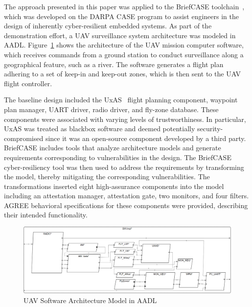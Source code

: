 

The approach presented in this paper was applied to the BriefCASE toolchain~\cite{CASEAtScale}, which was developed on the DARPA CASE program to assist engineers in the design of inherently cyber-resilient embedded systems.
As part of the demonstration effort, a UAV surveillance system architecture was modeled in AADL. 
%
Figure~\ref{SW} shows the architecture of the UAV mission computer software, which receives commands from a ground station to conduct surveillance along a geographical feature, such as a river.  The software generates a flight plan adhering to a set of keep-in and keep-out zones, which is then sent to the UAV flight controller. 

The baseline design included the UxAS~\cite{uxas} flight planning component, waypoint plan manager, UART driver, radio driver, and fly-zone database.
These components were associated with varying levels of trustworthiness.
In particular, UxAS was treated as blackbox software and deemed potentially security-compromised since it was an open-source component developed by a third party.
BriefCASE includes tools that analyze architecture models and generate requirements corresponding to vulnerabilities in the design.  The BriefCASE cyber-resiliency tool was then used to address the requirements by transforming the model, thereby mitigating the corresponding vulnerabilities.  The transformations inserted eight high-assurance components into the model including an attestation manager, attestation gate, two monitors, and four filters.
AGREE behavioral specifications for these components were provided, describing their intended functionality.

\begin{figure}[t!]
\centering
\includegraphics[width=120mm]{sw4.png}
\caption{UAV Software Architecture Model in AADL \label{SW}}
\end{figure}

